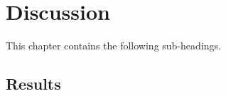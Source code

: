 \chapter{Discussion}
\label{cha:discussion}

%
%











This chapter contains the following sub-headings.



\section{Results}
\label{sec:discussion-results}



